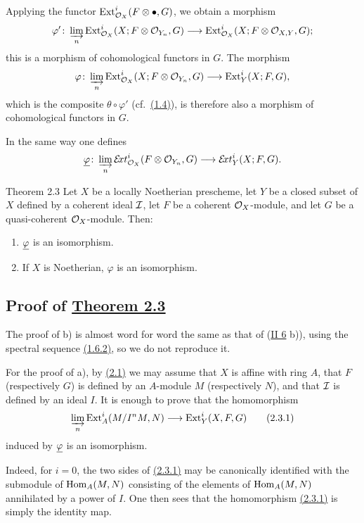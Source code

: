 Applying the functor $\operatorname{Ext}_{\mathcal O_X}^{i}(F\otimes\mathord\bullet,G)$, we obtain a
morphism
\[
 \varphi'\colon
 \varinjlim_n \operatorname{Ext}_{\mathcal O_X}^{i}(X;F\otimes\mathcal O_{Y_{n}},G)
 \longrightarrow \operatorname{Ext}_{\mathcal O_X}^{i}(X;F\otimes\mathcal O_{X,Y},G);
\]
this is a morphism of cohomological functors in $G$. The morphism
\[
 \varphi\colon
 \varinjlim_n \operatorname{Ext}_{\mathcal O_X}^{i}(X;F\otimes\mathcal O_{Y_{n}},G)
 \longrightarrow \operatorname{Ext}_Y^{i}(X;F,G),
\]
which is the composite $\theta\circ\varphi'$ (cf.~\hyperref[VI.1.4]{(1.4)}), is therefore also a
morphism of cohomological functors in $G$.

In the same way one defines
\[
 \underline{\varphi}\colon
 \varinjlim_n \mathcal E\!xt_{\mathcal O_X}^{i}(F\otimes\mathcal O_{Y_{n}},G)
 \longrightarrow \mathcal E\!xt_Y^{i}(X;F,G).
\]

\begin{sgastatement}{Theorem 2.3}
Let $X$ be a locally Noetherian prescheme, let $Y$ be a closed subset of $X$
defined by a coherent ideal $\mathcal I$, let $F$ be a coherent $\mathcal O_X$-module,
and let $G$ be a quasi-coherent $\mathcal O_X$-module. Then:
\begin{enumerate}
 \renewcommand{\labelenumi}{\alph{enumi})}
 \item $\underline{\varphi}$ is an isomorphism.
 \item If $X$ is Noetherian, $\varphi$ is an isomorphism.
\end{enumerate}
\end{sgastatement}

\subsection*{Proof of \hyperref[VI.2.3]{Theorem 2.3}}
The proof of b) is almost word for word the same as that of
\textup{(\hyperref[II.6]{II 6} b))}, using the spectral sequence \hyperref[VI.1.6.2]{(1.6.2)}, so we do not reproduce
it.

For the proof of a), by \hyperref[VI.2.1]{(2.1)} we may assume that $X$ is affine with ring $A$,
that $F$ (respectively $G$) is defined by an $A$-module $M$ (respectively
$N$), and that $\mathcal I$ is defined by an ideal $I$. It is enough to prove
that the homomorphism
\begin{equation}
 \varinjlim_n \operatorname{Ext}_A^i(M/I^nM,N)
 \longrightarrow \operatorname{Ext}_Y^i(X,F,G)
 \tag{2.3.1}\label{VI.2.3.1}
\end{equation}
induced by $\underline{\varphi}$ is an isomorphism.

Indeed, for $i=0$, the two sides of \hyperref[VI.2.3.1]{(2.3.1)} may be canonically identified with
the submodule of $\operatorname{Hom}_A(M,N)$ consisting of the elements of
$\operatorname{Hom}_A(M,N)$ annihilated by a power of $I$. One then sees that the
homomorphism \hyperref[VI.2.3.1]{(2.3.1)} is simply the identity map.

